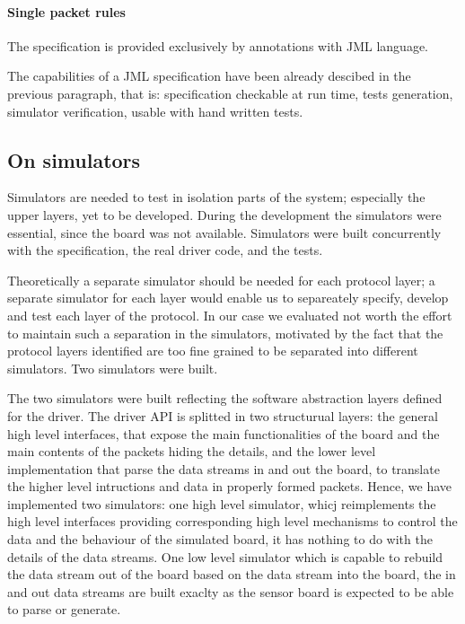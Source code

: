 \documentclass{article}
\begin{document}
\paragraph{Single packet rules}

The specification is provided exclusively by annotations with JML language. 

The capabilities of a JML specification have been already descibed in the previous 
paragraph, that is: specification checkable at run time, tests generation, simulator 
verification, usable with hand written tests.

\subsection{On simulators}
\label{subsec:on_simulators}

Simulators are needed to test in isolation parts of the system; especially the upper 
layers, yet to be developed. 
During the development the simulators were essential, since the board was not available.
Simulators were built concurrently with the specification, the real driver code, and the 
tests.

Theoretically a separate simulator should be needed for each protocol layer; a
separate simulator for each layer would enable us to separeately specify, develop and test
each layer of the protocol.
In our case we evaluated not worth the effort to maintain such a separation in the 
simulators, motivated by the fact that the protocol layers identified are too fine grained 
to be separated into different simulators. 
Two simulators were built.

The two simulators were built reflecting the software abstraction layers defined for the 
driver.
The driver API is splitted in two structurual layers: the general high level interfaces, that 
expose the main functionalities of the board and the main contents of the packets hiding the 
details, and the lower level implementation that parse the data streams in and out the board, 
to translate the higher level intructions and data in properly formed packets.
Hence, we have implemented two simulators: one high level simulator, whicj reimplements the 
high level interfaces providing corresponding high level mechanisms to control the data and 
the behaviour of the simulated board, it has nothing to do with the details of the data 
streams.
One low level simulator which is capable to rebuild the data stream out of the board based on 
the data stream into the board, the in and out data streams are built exaclty as the sensor 
board is expected to be able to parse or generate.
\end{document}
